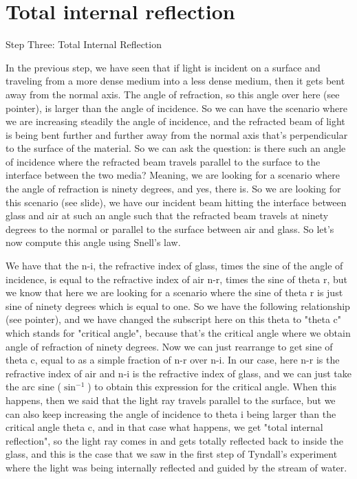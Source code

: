 \section{Total internal reflection}

Step Three: Total Internal Reflection

In the previous step, we have seen that if light is incident on a surface and traveling from a more dense medium into a less dense medium, then it gets bent away from the normal axis. The angle of refraction, so this angle over here (see pointer), is larger than the angle of incidence. So we can have the scenario where we are increasing steadily the angle of incidence, and the refracted beam of light is being bent further and further away from the normal axis that's perpendicular to the surface of the material. So we can ask the question: is there such an angle of incidence where the refracted beam travels parallel to the surface to the interface between the two media? Meaning, we are looking for a scenario where the angle of refraction is ninety degrees, and yes, there is. So we are looking for this scenario (see slide), we have our incident beam hitting the interface between glass and air at such an angle such that the refracted beam travels at ninety degrees to the normal or parallel to the surface between air and glass. So let's now compute this angle using Snell's law.

We have that the n-i, the refractive index of glass, times the sine of the angle of incidence, is equal to the refractive index of air n-r, times the sine of theta r, but we know that here we are looking for a scenario where the sine of theta r is just sine of ninety degrees which is equal to one. So we have the following relationship (see pointer), and we have changed the subscript here on this theta to "theta c" which stands for "critical angle", because that's the critical angle where we obtain angle of refraction of ninety degrees. Now we can just rearrange to get sine of theta c, equal to as a simple fraction of n-r over n-i. In our case, here n-r is the refractive index of air and n-i is the refractive index of glass, and we can just take the arc sine ($\sin^{-1}$) to obtain this expression for the critical angle. When this happens, then we said that the light ray travels parallel to the surface, but we can also keep increasing the angle of incidence to theta i being larger than the critical angle theta c, and in that case what happens, we get "total internal reflection", so the light ray comes in and gets totally reflected back to inside the glass, and this is the case that we saw in the first step of Tyndall's experiment where the light was being internally reflected and guided by the stream of water.


